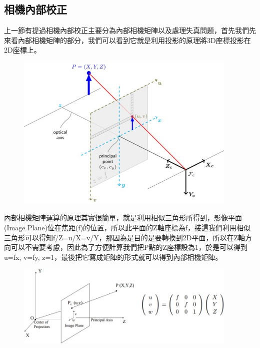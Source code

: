 \documentclass{article}
\begin{document}
\subsection{相機內部校正}

上一節有提過相機內部校正主要分為內部相機矩陣以及處理失真問題，首先我們先來看內部相機矩陣的部分，我們可以看到它就是利用投影的原理將3D座標投影在2D座標上。
\\
\begin{figure}[htp]
    \begin{center}
        \includegraphics[width=300pt]{pic/圖片6.jpg}
    \end{center}
\end{figure}

內部相機矩陣運算的原理其實很簡單，就是利用相似三角形所得到，影像平面(Image Plane)位在焦距(f)的位置，所以此平面的Z軸座標為f，接這我們利用相似三角形可以得知f/Z=u/X=v/Y，那因為是目的是要轉換到2D平面，所以在Z軸方向可以不需要考慮，因此為了方便計算我們把P點的Z座標設為1，於是可以得到u=fx, v=fy, z=1，最後把它寫成矩陣的形式就可以得到內部相機矩陣。
\\
\begin{figure}[htp]
    \begin{center}
        \includegraphics[width=300pt]{pic/圖片7.jpg}
    \end{center}
\end{figure}
\end{document}
